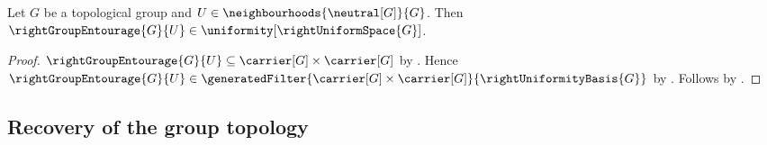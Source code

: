 \begin{proposition}\label{right_group_basic_entourage_is_entourage}
    Let $G$ be a topological group and
        $U\in\neighbourhoods{\neutral[G]}{G}$.
    Then $\rightGroupEntourage{G}{U}
        \in\uniformity[\rightUniformSpace{G}]$.
\end{proposition}
\begin{proof}
    $\rightGroupEntourage{G}{U}
        \subseteq\carrier[G]\times\carrier[G]$
        by .
    Hence $\rightGroupEntourage{G}{U}\in\generatedFilter
        {\carrier[G]\times\carrier[G]}{\rightUniformityBasis{G}}$
        by .
    Follows by .
\end{proof}

\subsection{Recovery of the group topology}

